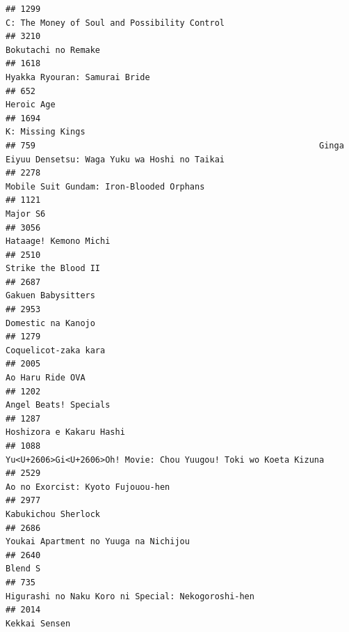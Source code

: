 \documentclass[
]{article}
\begin{document}
\begin{verbatim}
## 1299                                                              C: The Money of Soul and Possibility Control
## 3210                                                                                       Bokutachi no Remake
## 1618                                                                             Hyakka Ryouran: Samurai Bride
## 652                                                                                                 Heroic Age
## 1694                                                                                          K: Missing Kings
## 759                                                         Ginga Eiyuu Densetsu: Waga Yuku wa Hoshi no Taikai
## 2278                                                                  Mobile Suit Gundam: Iron-Blooded Orphans
## 1121                                                                                                  Major S6
## 3056                                                                                     Hataage! Kemono Michi
## 2510                                                                                       Strike the Blood II
## 2687                                                                                        Gakuen Babysitters
## 2953                                                                                        Domestic na Kanojo
## 1279                                                                                      Coquelicot-zaka kara
## 2005                                                                                          Ao Haru Ride OVA
## 1202                                                                                     Angel Beats! Specials
## 1287                                                                                  Hoshizora e Kakaru Hashi
## 1088                                          Yu<U+2606>Gi<U+2606>Oh! Movie: Chou Yuugou! Toki wo Koeta Kizuna
## 2529                                                                         Ao no Exorcist: Kyoto Fujouou-hen
## 2977                                                                                       Kabukichou Sherlock
## 2686                                                                     Youkai Apartment no Yuuga na Nichijou
## 2640                                                                                                   Blend S
## 735                                                         Higurashi no Naku Koro ni Special: Nekogoroshi-hen
## 2014                                                                                             Kekkai Sensen

\end{verbatim}
\end{document}
